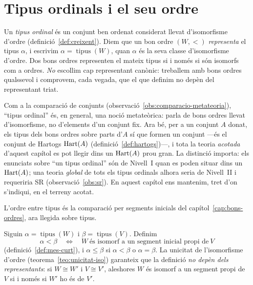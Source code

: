 \section{Tipus ordinals i el seu ordre}\label{sec:tipus-ordinals}

\begin{definicio}\label{def:tipus-ordinal}
Un \emph{tipus ordinal} és un conjunt ben ordenat considerat llevat
d'isomorfisme d'ordre (definició~\ref{def:creixent}). Diem que un bon ordre
\((W,<)\) \emph{representa} el tipus \(\alpha\), i escrivim
\(\alpha=\operatorname{tipus}(W)\), quan \(\alpha\) és la seva classe
d'isomorfisme d'ordre. Dos bons ordres representen el mateix tipus si i només
si són isomorfs com a ordres. \emph{No} escollim cap representant canònic:
treballem amb bons ordres qualssevol i comprovem, cada vegada, que el que
definim no depèn del representant triat.
\end{definicio}

\begin{observacio}\label{obs:tipus-acotats}
Com a la comparació de conjunts (observació~\ref{obs:comparacio-metateoria}),
\enquote{tipus ordinal} és, en general, una noció metateòrica: parla de bons
ordres llevat d'isomorfisme, no d'elements d'un conjunt fix. Ara bé, per a un
conjunt \(A\) donat, els tipus dels bons ordres sobre parts d'\(A\) sí que
formen un conjunt ---és el conjunt de Hartogs \(\operatorname{Hart}(A)\)
(definició~\ref{def:hartogs})---, i tota la teoria \emph{acotada} d'aquest
capítol es pot llegir dins un \(\operatorname{Hart}(A)\) prou gran. La distinció importa: els
enunciats sobre \enquote{un tipus ordinal} són de Nivell~I quan es poden
situar dins un \(\operatorname{Hart}(A)\); una teoria \emph{global} de tots els tipus
ordinals alhora seria de Nivell~II i requeriria SR
(observació~\ref{obs:sr}). En aquest capítol ens mantenim, tret d'on
s'indiqui, en el terreny acotat.
\end{observacio}

L'ordre entre tipus és la comparació per segments inicials del
capítol~\ref{cap:bons-ordres}, ara llegida sobre tipus.

\begin{definicio}\label{def:ordre-ordinals}
Siguin \(\alpha=\operatorname{tipus}(W)\) i \(\beta=\operatorname{tipus}(V)\).
Definim
\[
\alpha<\beta
\quad\Longleftrightarrow\quad
W\ \text{és isomorf a un segment inicial propi de}\ V
\]
(definició~\ref{def:mes-curt}), i \(\alpha\le\beta\) si \(\alpha<\beta\) o
\(\alpha=\beta\). La unicitat de l'isomorfisme d'ordre
(teorema~\ref{teo:unicitat-iso}) garanteix que la definició \emph{no depèn dels
representants}: si \(W\cong W'\) i \(V\cong V'\), aleshores \(W\) és isomorf a
un segment propi de \(V\) si i només si \(W'\) ho és de \(V'\).
\end{definicio}

